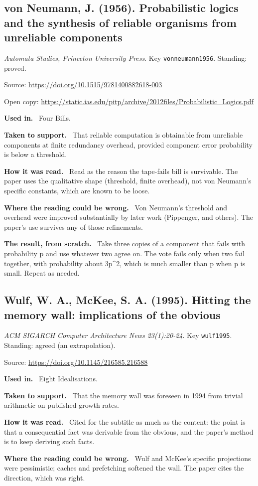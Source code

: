 \documentclass[11pt,oneside]{article}
\newcommand{\field}[1]{\par\noindent\textbf{\color{accent}#1.}\ }
\begin{document}
\subsection*{von Neumann, J. (1956). Probabilistic logics and the synthesis of reliable organisms from unreliable components}
\noindent\small\emph{Automata Studies, Princeton University Press}. Key \texttt{vonneumann1956}. Standing: proved.
\par\noindent\small Source: \url{https://doi.org/10.1515/9781400882618-003}
\par\noindent\small Open copy: \url{https://static.ias.edu/pitp/archive/2012files/Probabilistic_Logics.pdf}
\normalsize
\field{Used in} Four Bills.
\field{Taken to support} That reliable computation is obtainable from unreliable components at finite redundancy overhead, provided component error probability is below a threshold.
\field{How it was read} Read as the reason the tape-fails bill is survivable. The paper uses the qualitative shape (threshold, finite overhead), not von Neumann's specific constants, which are known to be loose.
\field{Where the reading could be wrong} Von Neumann's threshold and overhead were improved substantially by later work (Pippenger, and others). The paper's use survives any of those refinements.
\field{The result, from scratch} Take three copies of a component that fails with probability p and use whatever two agree on. The vote fails only when two fail together, with probability about 3p\textasciicircum{}2, which is much smaller than p when p is small. Repeat as needed.

\hypertarget{src:wulf1995}{}
\subsection*{Wulf, W. A., McKee, S. A. (1995). Hitting the memory wall: implications of the obvious}
\noindent\small\emph{ACM SIGARCH Computer Architecture News 23(1):20-24}. Key \texttt{wulf1995}. Standing: agreed (an extrapolation).
\par\noindent\small Source: \url{https://doi.org/10.1145/216585.216588}
\normalsize
\field{Used in} Eight Idealisations.
\field{Taken to support} That the memory wall was foreseen in 1994 from trivial arithmetic on published growth rates.
\field{How it was read} Cited for the subtitle as much as the content: the point is that a consequential fact was derivable from the obvious, and the paper's method is to keep deriving such facts.
\field{Where the reading could be wrong} Wulf and McKee's specific projections were pessimistic; caches and prefetching softened the wall. The paper cites the direction, which was right.
\end{document}
